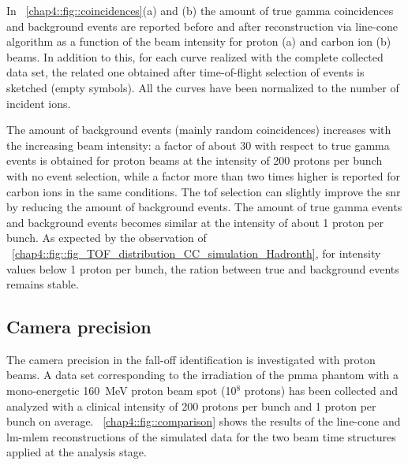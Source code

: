 In \figurename~\ref{chap4::fig::coincidences}(a) and (b) the amount of true gamma coincidences and background events are reported before and after reconstruction via line-cone algorithm as a function of the beam intensity for proton (a) and carbon ion (b) beams. In addition to this, for each curve realized with the complete collected data set, the related one obtained after time-of-flight selection of events is sketched (empty symbols). All the curves have been normalized to the number of incident ions.

The amount of background events (mainly random coincidences) increases with the increasing beam intensity: a factor of about 30 with respect to true gamma events is obtained for proton beams at  the intensity of 200 protons per bunch with no event selection, while a factor more than two times higher is reported for carbon ions in the same conditions. The \gls{tof} selection can slightly improve the \gls{snr} by reducing the amount of background events. The amount of true gamma events and background events becomes similar at the intensity of about 1 proton per bunch. As expected by the observation of \figurename~\ref{chap4::fig::fig_TOF_distribution_CC_simulation_Hadronth}, for intensity values below 1 proton per bunch, the ration between true and background events remains stable. 


\subsection{Camera precision}\label{chap4::subsec::Res_precision_reconstruction}
The camera precision in the fall-off identification is investigated with proton beams.
A data set corresponding to the irradiation of the \gls{pmma} phantom with a mono-energetic 160~MeV proton beam spot (10$^8$ protons) has been collected and analyzed with a clinical intensity of 200 protons per bunch and 1 proton per bunch on average. 
\figurename~\ref{chap4::fig::comparison} shows the results of the line-cone and \gls{lm-mlem} reconstructions of the simulated data for the two beam time structures applied at the analysis stage.  

